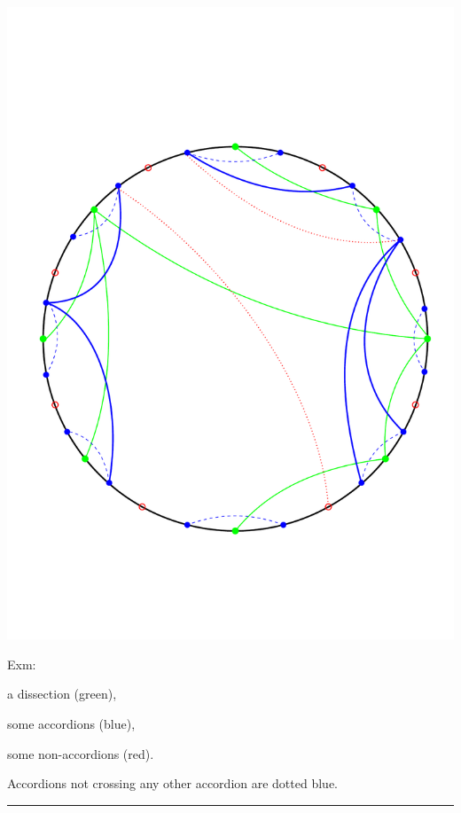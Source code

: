 \documentclass[portrait,final,a0paper,fontscale=0.25]{baposter}
\theoremstyle{definition}
\begin{document}
\begin{poster}
{\hspace*{6cm}\includegraphics[scale=.20]{DissectionAccordions}

\vspace*{-3.3cm}
\begin{minipage}{5.7cm}
Exm:

\smallskip
\begin{compactitem}
 \item a dissection (green),
 \item some accordions (blue),
 \item some non-accordions (red).
\end{compactitem}

\medskip
Accordions not crossing any other accordion are dotted blue.
\end{minipage}


\vspace{.7cm}
\hspace{-.25cm}
{\color{blue} \rule{10.02cm}{1pt}}
\vspace{-.35cm}

}
\end{poster}
\end{document}
